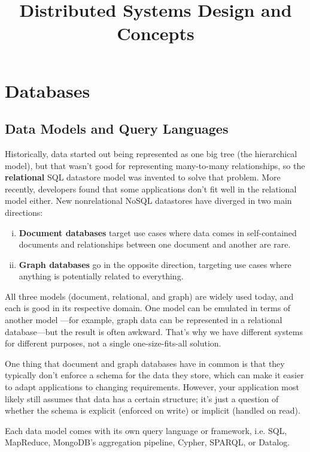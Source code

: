 \documentclass{article}
\title{\vspace{-3cm} Distributed Systems Design and Concepts}
\author{}
\date{}
\begin{document}
\maketitle
\vspace{-1.5cm}
\tableofcontents
\newpage

\section{Databases}
    \subsection{Data Models and Query Languages}
    Historically, data started out being represented as one big tree (the hierarchical model), but that wasn’t good for representing many-to-many relationships, so the \textbf{relational} SQL datastore model was invented to solve that problem. More recently, developers found that some applications don’t fit well in the relational model either. New nonrelational NoSQL datastores have diverged in two main directions:
    \begin{enumerate}[i.]
        \item \textbf{Document databases} target use cases where data comes in self-contained documents and relationships between one document and another are rare.
        \item \textbf{Graph databases} go in the opposite direction, targeting use cases where anything is potentially related to everything.
    \end{enumerate}
    
    All three models (document, relational, and graph) are widely used today, and each is good in its respective domain. One model can be emulated in terms of another model —for example, graph data can be represented in a relational database—but the result is often awkward. That’s why we have different systems for different purposes, not a single one-size-fits-all solution. 
    
    One thing that document and graph databases have in common is that they typically don’t enforce a schema for the data they store, which can make it easier to adapt applications to changing requirements. However, your application most likely still assumes that data has a certain structure; it’s just a question of whether the schema is explicit (enforced on write) or implicit (handled on read).
    
    Each data model comes with its own query language or framework, i.e. SQL, MapReduce, MongoDB’s aggregation pipeline, Cypher, SPARQL, or Datalog. 
    
\end{document}
